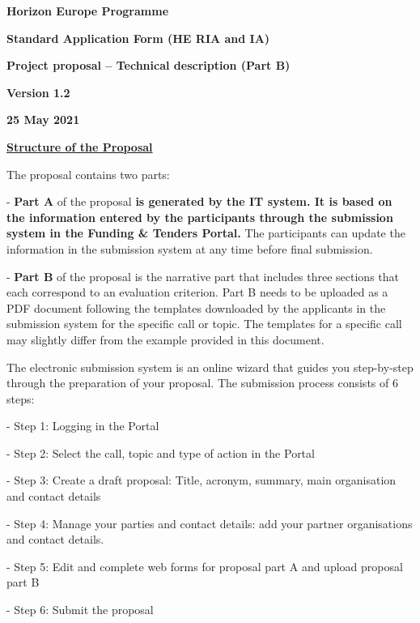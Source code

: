 \textbf{Horizon Europe Programme}

\textbf{Standard Application Form (HE RIA and IA)}

\textbf{Project proposal -- Technical description (Part B) }

\textbf{Version 1.2}

\textbf{25 May 2021}

\textbf{\uline{Structure of the Proposal }}

The proposal contains two parts:

- \textbf{Part A} of the proposal \textbf{is generated by the IT system.
It is based on the information entered by the participants through the
submission system in the Funding \& Tenders Portal.} The participants
can update the information in the submission system at any time before
final submission.

- \textbf{Part B} of the proposal is the narrative part that includes
three sections that each correspond to an evaluation criterion. Part B
needs to be uploaded as a PDF document following the templates
downloaded by the applicants in the submission system for the specific
call or topic. The templates for a specific call may slightly differ
from the example provided in this document.

The electronic submission system is an online wizard that guides you
step-by-step through the preparation of your proposal. The submission
process consists of 6 steps:

- Step 1: Logging in the Portal

- Step 2: Select the call, topic and type of action in the Portal

- Step 3: Create a draft proposal: Title, acronym, summary, main
organisation and contact details

- Step 4: Manage your parties and contact details: add your partner
organisations and contact details.

- Step 5: Edit and complete web forms for proposal part A and upload
proposal part B

- Step 6: Submit the proposal


